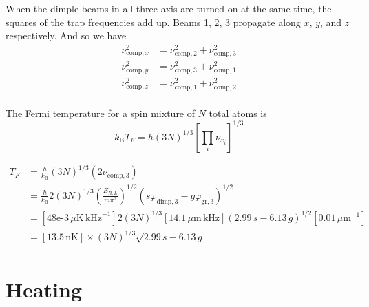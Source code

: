 \documentclass[11pt,letter]{article}
\begin{document}
\vspace{0.5em}
When the dimple beams in all three axis are turned on at the same time, the
squares of the trap frequencies add up.   Beams 1,  2, 3 propagate along $x$,
$y$, and $z$ respectively.  And so we have 
\begin{equation} 
\begin{split} 
  \nu_{\text{comp},x}^{2} & = \nu_{\text{comp},2}^{2} + \nu_{\text{comp},3}^{2} \\ 
  \nu_{\text{comp},y}^{2} & = \nu_{\text{comp},3}^{2} + \nu_{\text{comp},1}^{2} \\ 
  \nu_{\text{comp},z}^{2} & = \nu_{\text{comp},1}^{2} + \nu_{\text{comp},2}^{2} \\ 
\end{split}
\end{equation}

The Fermi temperature for a spin mixture of $N$ total atoms is 
\begin{equation}
 k_{\text{B}} T_{F} = h (3N)^{1/3} \left[ \prod_{i} \nu_{x_{i}} \right]^{1/3}
\end{equation} 

\begin{equation}
\begin{split}
  T_{F} & = \frac{h}{k_{\text{B}}} (3N)^{1/3} 
 \left( 2\nu_{\text{comp},3 } \right) \\ 
 & = \frac{h}{k_{\text{B}}} 2(3N)^{1/3}
 \left( \frac{ E_{R,L}  }{m\pi^{2}} \right)^{1/2}
  ( s\varphi_{\text{dimp},3} - g\varphi_{\text{gr},3}  )^{1/2 }\\ 
 & = \left[ 48\text{e-3}\, \mu\text{K}\,\text{kHz}^{-1}\right]
   2 (3N)^{1/3}  
  \left[ 14.1 \, \mu\text{m}\,\text{kHz} \right]
  ( 2.99\, s - 6.13\, g )^{1/2 }
   \left[ 0.01 \, \mu\text{m}^{-1} \right] 
   \\ 
  & =  [ 13.5 \,\text{nK}  ] \times (3N)^{1/3} \sqrt{2.99\,s-6.13\,g} \, \\ 
\end{split} 
\end{equation} 


\section{Heating}

\end{document}
